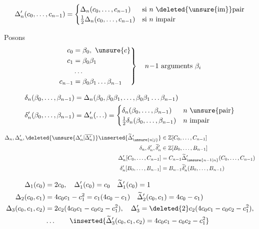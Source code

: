 \[
\Delta'_n(c_0,\ldots,c_{n-1})=
\begin{cases}
\Delta_n(c_0,\ldots,c_{n-1})&\text{si $n$ \deleted{\unsure{im}}pair}\\
\frac12\Delta_n(c_0,\ldots,c_{n-1})&\text{si $n$ impair}
\end{cases}
\]

Posons
\[
\left.\begin{aligned}
c_0&=\beta_0,\ \unsure{c}\\
c_1&=\beta_0\beta_1\\
&\ldots\\
c_{n-1}&=\beta_0\beta_1\ldots\beta_{n-1}
\end{aligned}\right\}\quad n\!-\!1\ \text{arguments }\beta_i
\]

\[
\begin{aligned}
\delta_n(\beta_0,\ldots,\beta_{n-1})&=\Delta_n(\beta_0,\beta_0\beta_1,\ldots,\beta_0\beta_1\ldots\beta_{n-1})\\
\delta'_n(\beta_0,\ldots,\beta_{n-1})&=\Delta'_n(\ldots)=\begin{cases}
\delta_n(\beta_0,\ldots,\beta_{n-1})&n\ \text{\unsure{pair}}\\
\frac12\delta_n(\beta_0,\ldots,\beta_{n-1})&n\ \text{impair}
\end{cases}
\end{aligned}
\]

\[
\begin{aligned}
\Delta_n,\Delta'_n,\deleted{\unsure{\Delta'_n|\overline{\Delta'_n}}}\inserted{\widetilde{\Delta}'_{\unsure{n|j}}}&\in\mathbb Z[C_0,\ldots,C_{n-1}]\\
\delta_n,\delta'_n,\widetilde{\delta}'_n&\in\mathbb Z[B_0,\ldots,B_{n-1}]\\
\Delta'_n[C_0,\ldots,C_{n-1}]&=C_{n-1}\widetilde{\Delta}'_{\unsure{n-1|n}}(C_0,\ldots,C_{n-1})\\
\delta'_n[B_0,\ldots,B_{n-1}]&=B_{n-1}\widetilde{\delta}'_n(B_0,\ldots,B_{n-1})
\end{aligned}
\]

\[
\begin{aligned}
\Delta_1(c_0)&=2c_0,\quad\Delta'_1(c_0)=c_0\quad\widetilde{\Delta}'_1(c_0)=1\\
\Delta_2(c_0,c_1)&=4c_0c_1-c_1^2=c_1(4c_0-c_1)\quad\widetilde{\Delta}'_2(c_0,c_1)=4c_0-c_1)\\
\Delta_3(c_0,c_1,c_2)&=2c_2(4c_0c_1-c_0c_2-c_1^2),\quad
\Delta'_3=\deleted{2}c_2(4c_0c_1-c_0c_2-c_1^2),\\
&\ldots\qquad\inserted{\widetilde{\Delta}'_3(c_0,c_1,c_2)=4c_0c_1-c_0c_2-c_1^2}
\end{aligned}
\]


